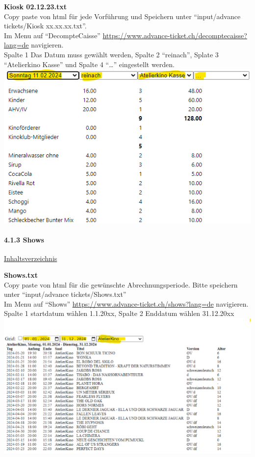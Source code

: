 \documentclass[
]{article}
\begin{document}
\textbf{Kiosk 02.12.23.txt}\\
Copy paste von html für jede Vorführung und Speichern unter
``input/advance tickets/Kiosk xx.xx.xx.txt''.\\
Im Menu auf ``DecompteCaisse''
\url{https://www.advance-ticket.ch/decomptecaisse?lang=de} navigieren.\\
Spalte 1 Das Datum muss gewählt werden, Spalte 2 ``reinach'', Splate 3
``Atelierkino Kasse'' und Spalte 4 ``\ldots{}'' eingestellt werden.\\
\includegraphics{doc/Kiosk.png}

\paragraph{4.1.3 Shows}\label{shows}

\hyperref[Inhaltsverzeichnis]{Inhaltsverzeichnis}

\textbf{Shows.txt}\\
Copy paste von html für die gewünschte Abrechnungsperiode. Bitte
speichern unter ``input/advance tickets/Shows.txt''\\
Im Menu auf ``Shows'' \url{https://www.advance-ticket.ch/shows?lang=de}
navigieren.\\
Spalte 1 startdatum wählen 1.1.20xx, Spalte 2 Enddatum wählen
31.12.20xx\\
\includegraphics{doc/shows.png}
\end{document}
